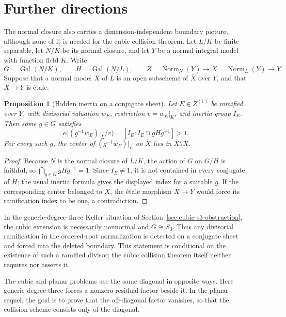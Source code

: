 \documentclass[11pt]{article}
\newtheorem{proposition}[theorem]{Proposition}
\theoremstyle{remark}
\theoremstyle{definition}
\DeclareMathOperator{\Gal}{Gal}
\DeclareMathOperator{\Norm}{Norm}
\begin{document}
\section{Further directions}
\label{sec:further-directions}

The normal closure also carries a dimension-independent boundary picture,
although none of it is needed for the cubic collision theorem.  Let
\(L/K\) be finite separable, let \(N/K\) be its normal closure, and let
\(Y\) be a normal integral model with function field \(K\).  Write
\[
  G=\Gal(N/K),\qquad H=\Gal(N/L),\qquad
  Z=\Norm_N(Y)\longrightarrow \overline X=\Norm_L(Y)\longrightarrow Y.
\]
Suppose that a normal model \(X\) of \(L\) is an open subscheme of
\(\overline X\) over \(Y\), and that \(X\to Y\) is \'etale.

\begin{proposition}[Hidden inertia on a conjugate sheet]
\label{prop:generic-hidden-inertia}
Let \(E\in Z^{(1)}\) be ramified over \(Y\), with divisorial valuation
\(w_E\), restriction \(v=w_E|_K\), and inertia group \(I_E\).  Then some
\(g\in G\) satisfies
\[
  e\bigl((g^{-1}w_E)|_L/v\bigr)
  =[I_E:I_E\cap gHg^{-1}]>1.
\]
For every such \(g\), the center of \((g^{-1}w_E)|_L\) on
\(\overline X\) lies in \(\overline X\setminus X\).
\end{proposition}

\begin{proof}
Because \(N\) is the normal closure of \(L/K\), the action of \(G\) on
\(G/H\) is faithful, so \(\bigcap_{g\in G}gHg^{-1}=1\).  Since
\(I_E\neq1\), it is not contained in every conjugate of \(H\); the usual
inertia formula gives the displayed index for a suitable \(g\).  If the
corresponding center belonged to \(X\), the \'etale morphism \(X\to Y\)
would force its ramification index to be one, a contradiction.
\end{proof}

In the generic-degree-three Keller situation of
Section~\ref{sec:cubic-s3-obstruction}, the cubic extension is necessarily
nonnormal and \(G\cong S_3\).  Thus any
divisorial ramification in the ordered-root normalization is detected on a
conjugate sheet and forced into the deleted boundary.  This statement is
conditional on the existence of such a ramified divisor; the cubic
collision theorem itself neither requires nor asserts it.

The cubic and planar problems use the same diagonal in opposite
ways.  Here generic degree three forces a nonzero residual factor beside
it.  In the planar sequel, the goal is to prove that the off-diagonal
factor vanishes, so that the collision scheme consists only of the
diagonal.
\end{document}
